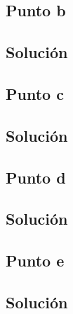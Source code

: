 \documentclass[12pt]{article}
\begin{document}
\subsection{Punto b}
\subsection{Solución}

\subsection{Punto c}
\subsection{Solución}

\subsection{Punto d}
\subsection{Solución}

\subsection{Punto e}
\subsection{Solución}
\end{document}
